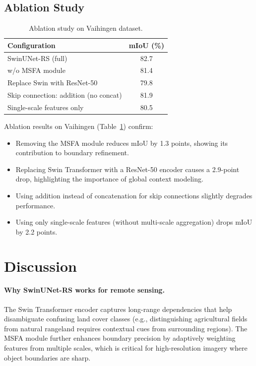 \documentclass[conference]{IEEEtran}
\begin{document}
\subsection{Ablation Study}\label{sec:ablation}

\begin{table}[t]
\centering
\caption{Ablation study on Vaihingen dataset.}
\label{tab:ablation}
\small
\begin{tabular}{lc}
\toprule
\textbf{Configuration} & \textbf{mIoU (\%)} \\
\midrule
SwinUNet-RS (full) & 82.7 \\
\midrule
w/o MSFA module & 81.4 \\
Replace Swin with ResNet-50 & 79.8 \\
Skip connection: addition (no concat) & 81.9 \\
Single-scale features only & 80.5 \\
\bottomrule
\end{tabular}
\end{table}

Ablation results on Vaihingen (Table~\ref{tab:ablation}) confirm:
\begin{itemize}
    \item Removing the MSFA module reduces mIoU by 1.3 points, showing its contribution to boundary refinement.
    \item Replacing Swin Transformer with a ResNet-50 encoder causes a 2.9-point drop, highlighting the importance of global context modeling.
    \item Using addition instead of concatenation for skip connections slightly degrades performance.
    \item Using only single-scale features (without multi-scale aggregation) drops mIoU by 2.2 points.
\end{itemize}

\section{Discussion}\label{sec:discussion}

\paragraph{Why SwinUNet-RS works for remote sensing.}
The Swin Transformer encoder captures long-range dependencies that help disambiguate
confusing land cover classes (e.g., distinguishing agricultural fields from natural rangeland
requires contextual cues from surrounding regions). The MSFA module further enhances
boundary precision by adaptively weighting features from multiple scales,
which is critical for high-resolution imagery where object boundaries are sharp.
\end{document}
